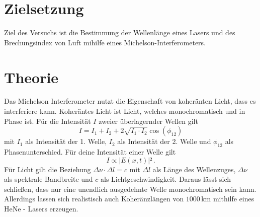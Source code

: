 \section{Zielsetzung}
\label{sec:Zielsetzung}
Ziel des Versuchs ist die Bestimmung der Wellenlänge eines Lasers und des Brechungsindex von Luft mihilfe eines Michelson-Interferometers.
\section{Theorie}
\label{sec:Theorie}
Das Michelson Interferometer nutzt die Eigenschaft von koheränten Licht, dass es interferiere kann. Koheräntes Licht ist Licht, welches monochromatisch 
und in Phase ist. Für die Intensität $I$ zweier überlagernder Wellen gilt 
\begin{equation}
I = I_1 + I_2 + 2 \sqrt{I_1 \cdot I_2} \cos(\phi_{12})  
\end{equation}
mit $I_1$ als Intensität der 1. Welle, $I_2$ als Intensität der 2. Welle und $\phi_{12}$ als Phasenunterschied. Für deine Intensität einer Welle gilt 
\begin{equation}
    I \propto |E(x,t)|² \, .
\end{equation}
Für Licht gilt die Beziehung $\Delta \nu \cdot \Delta l = c$ mit $\Delta l$ als Länge des Wellenzuges, $\Delta \nu$ als spektrale Bandbreite und $c$ als 
Lichtgeschwindigkeit. Daraus lässt sich schließen, dass nur eine unendlich ausgedehnte Welle monochromatisch sein kann. 
Allerdings lassen sich realistisch auch Koheränzlängen von $1000 \, \unit{\kilo\meter}$ mithilfe eines HeNe - Lasers erzeugen. 

